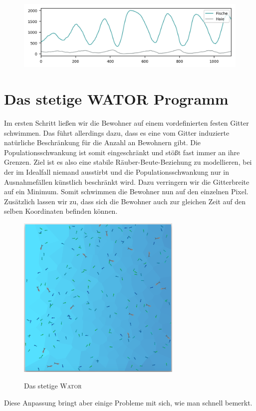 \documentclass[a4paper,11pt]{article}
\newcommand{\wator}{\textsc{Wator }}
\theoremstyle{definition}
\numberwithin{equation}{section}
\begin{document}
	\begin{figure}
		\centering
		\includegraphics[width=\textwidth]{pictures/classic_big.png}
		\label{fig:classic_big}
	\end{figure}

	\section{Das stetige WATOR Programm}
	Im ersten Schritt ließen wir die Bewohner auf einem vordefinierten festen Gitter schwimmen. Das führt allerdings dazu, dass es eine vom Gitter induzierte natürliche Beschränkung für die Anzahl an Bewohnern gibt. Die Populationsschwankung ist somit eingeschränkt und stößt fast immer an ihre Grenzen. Ziel ist es also eine stabile Räuber-Beute-Beziehung zu modellieren, bei der im Idealfall niemand ausstirbt und die Populationsschwankung nur in Ausnahmefällen künstlich beschränkt wird.
	Dazu verringern wir die Gitterbreite auf ein Minimum. Somit schwimmen die Bewohner nun auf den einzelnen Pixel. Zusätzlich lassen wir zu, dass sich die Bewohner auch zur gleichen Zeit auf den selben Koordinaten befinden können.
	\begin{figure}
		\centering
		\includegraphics[width=0.7\textwidth]{pictures/continuous.png}
		\label{fig:encounter}
		\caption{Das stetige \wator}
	\end{figure}
	Diese Anpassung bringt aber einige Probleme mit sich, wie man schnell bemerkt.\newline
	
\end{document}
